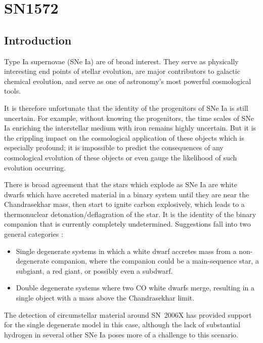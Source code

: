 \chapter{SN1572}
\label{chap:SN1572}

\section{Introduction}
Type Ia supernovae (SNe Ia) are of broad interest. They serve as
physically interesting end points of stellar evolution, are major
contributors to galactic chemical evolution, and serve as one of
astronomy's most powerful cosmological tools.

It is therefore unfortunate that the identity of the progenitors
of SNe Ia is still uncertain. For example, without knowing the progenitors,
the time scales of SNe Ia enriching the interstellar medium with iron
remains highly uncertain. But it is the crippling impact on the
cosmological application of these objects which is especially
profound; it is impossible to predict the consequences of any
cosmological evolution of these objects or even gauge the likelihood of
such evolution occurring.

There is broad agreement that the stars which explode as SNe Ia are
white dwarfs which have accreted material in a binary system until
they are near the Chandrasekhar mass, then start to ignite carbon
explosively, which leads to a thermonuclear detonation/deflagration of the
star. It is the identity of the binary companion that is currently
completely undetermined. Suggestions fall into two general categories
\citep{1997thsu.conf..111I}:
\begin{itemize}
\item Single degenerate systems in which a white dwarf accretes mass
from a non-degenerate companion, where the companion could be a
main-sequence star, a subgiant, a red giant, or possibly even a
subdwarf.
\item Double degenerate systems where two CO white dwarfs merge,
resulting in a single object with a mass above the Chandrasekhar limit.
\end{itemize}

The detection of circumstellar material around SN~2006X
\citep{2007Sci...317..924P} has provided support for the single
degenerate model in this case, although the lack of substantial 
hydrogen in several other SNe Ia \citep{2007ApJ...670.1275L} 
poses more of a challenge to this scenario.

